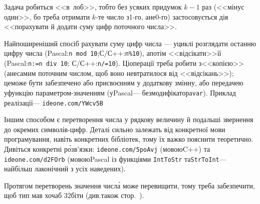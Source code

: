 \Tutorial	Задача робиться <<в~лоб>>, тобто без усяких придумок $k{-}1$ раз (<<мінус один>>, бо треба отримати \mbox{$k$-те} число з\nolinebreak[3] \mbox{1-го}, а\nolinebreak[3] не\nolinebreak[3] \mbox{0-го}) застосовується дія <<порахувати й додати суму цифр поточного числа>>. 

\label{text:sum-of-digits}
Найпоширеніший спосіб рахувати суму цифр числа --- у\nolinebreak[3] циклі розглядати останню цифру числа (Pascal:\nolinebreak[2] \mbox{\texttt{n~mod~10}};\linebreak[1] С/С++:\nolinebreak[2] \mbox{\texttt{n\%10}}), а\nolinebreak[3] потім <<відсікати>>\nolinebreak[2] її (Pascal:\nolinebreak[2] \mbox{\texttt{n:=n~div~10}}; С/С++:\nolinebreak[2] \mbox{\texttt{n/=10}}). Ці\nolinebreak[2] операції треба робити з\nolinebreak[3] <<копією>> (а\nolinebreak[3] не\nolinebreak[3] самим поточним числом, щоб воно не\nolinebreak[3] втратилося від <<відсікань>>); це\nolinebreak[1] може бути забезпечено або присвоєнням у додаткову змінну, або передачею у\nolinebreak[3] функцію параметром-значенням (у\nolinebreak[3] Pascal\nolinebreak[3] --- без\nolinebreak[2] модифікатора\nolinebreak[2] \texttt{var}). Приклад реалізації\nolinebreak[3] --- \verb"ideone.com/YWcv5B"

Іншим способом є перетворення числа у рядкову величину й подальші звернення до окремих символів-цифр. Деталі сильно залежать від конкретної мови програмування, навіть конкретних бібліотек, тому їх важко пояснити теоретично. Дивіться конкретні р\'{о}зв'язки: \verb"ideone.com/5poAvj" (мовою\nolinebreak[2] C++) та \verb"ideone.com/d2FOrb" (мовою\nolinebreak[1] Pascal із функціями \texttt{IntToStr} та\nolinebreak[2] \texttt{StrToInt}\nolinebreak[3] --- найбільш лаконічний з усіх наведених).

Протягом перетворень значення числ\'{а} може перевищити, тому треба забезпечити, щоб тип мав хоча\nolinebreak[3] б 32\nolinebreak[3] біти (див.\nolinebreak[2] також стор.~\pageref{text:overflow-example}).
